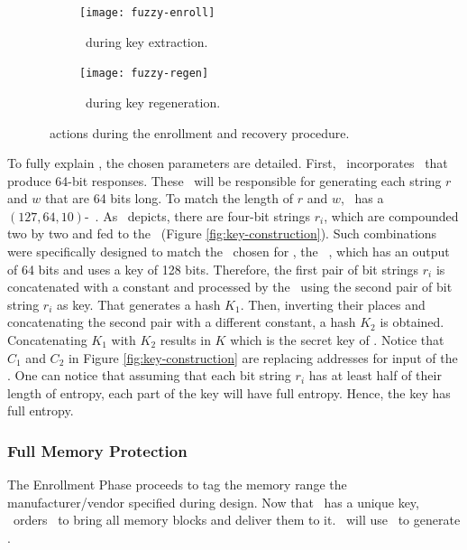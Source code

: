 \begin{figure}
     \centering
     \begin{subfigure}[b]{0.5\textwidth}
         \centering
         \texttt{[image: fuzzy-enroll]}
         \caption{\fuzzy~during key extraction.}
         \label{fig:fuzzy-enroll}
     \end{subfigure}
     \hfill
     \begin{subfigure}[b]{0.5\textwidth}
         \centering
         \texttt{[image: fuzzy-regen]}
         \caption{\fuzzy~during key regeneration.}
         \label{fig:fuzzy-regen}
     \end{subfigure}

        \caption{\fuzzy~actions during the enrollment and recovery procedure.}
        \label{fig:fuzzy-extractor}
\end{figure}

To fully explain \fenroll, the chosen parameters are detailed. First, \cshia~incorporates \pufs~that produce 64-bit responses. These \pufs~will be responsible for generating each string $r$ and $w$ that are 64 bits long. To match the length of $r$ and $w$, \cshia~has a $(127, 64, 10)$-\bch~\ecc. As \fenroll~depicts, there are four-bit strings $r_i$, which are compounded two by two and fed to the \prf~(Figure \ref{fig:key-construction}). Such combinations were specifically designed to match the \prf~chosen for \cshia, the \siphash~\cite{Aumasson2012:SipHash}, which has an output of 64 bits and uses a key of 128 bits. Therefore, the first pair of bit strings $r_i$ is concatenated with a constant and processed by the \prf~using the second pair of bit string $r_i$ as key. That generates a hash $K_1$. Then, inverting their places and concatenating the second pair with a different constant, a hash $K_2$ is obtained. Concatenating $K_1$ with $K_2$ results in $K$ which is the secret key of \cshia. Notice that $C_1$ and $C_2$ in Figure \ref{fig:key-construction} are replacing addresses for input of the \ptaggen. One can notice that assuming that each bit string $r_i$ has at least half of their length of entropy, each part of the key will have full entropy. Hence, the key has full entropy. 

\subsubsection{Full Memory Protection}
\label{subsubsec:Full-Memory-Protection}

The Enrollment Phase proceeds to tag the memory range the manufacturer\slash{}vendor specified during design. Now that \ptaggen~has a unique key, \seceng~orders \handler~to bring all memory blocks and deliver them to it. \seceng~will use \ptaggen~to generate \ptags.%


